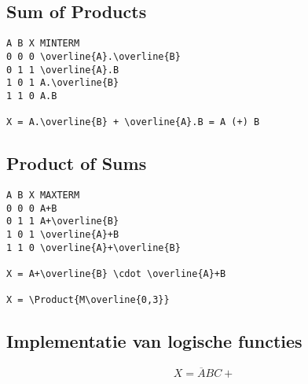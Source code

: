 \documentclass[11pt, a4paper]{article}
\begin{document}
\subsection{Sum of Products}

\begin{verbatim}
A B X MINTERM
0 0 0 \overline{A}.\overline{B}
0 1 1 \overline{A}.B
1 0 1 A.\overline{B}
1 1 0 A.B

X = A.\overline{B} + \overline{A}.B = A (+) B
\end{verbatim}

\subsection{Product of Sums}

\begin{verbatim}
A B X MAXTERM
0 0 0 A+B
0 1 1 A+\overline{B}
1 0 1 \overline{A}+B
1 1 0 \overline{A}+\overline{B}

X = A+\overline{B} \cdot \overline{A}+B

X = \Product{M\overline{0,3}}
\end{verbatim}

\subsection{Implementatie van logische functies}

$$ X = \overline{A}BC + $$

\newpage
\end{document}
